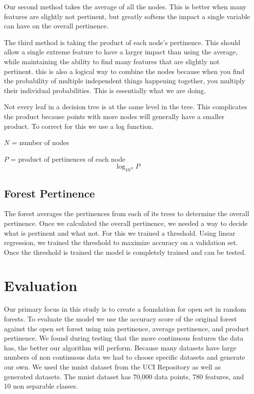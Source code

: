 \documentclass[conference]{IEEEtran}
\begin{document}
Our second method takes the average of all the nodes.  This is better when many features are slightly not pertinent, but greatly softens the impact a single variable can have on the overall pertinence.  

The third method is taking the product of each node's pertinence.  This should allow a single extreme feature to have a larger impact than using the average, while maintaining the ability to find many features that are slightly not pertinent.  this is also a logical way to combine the nodes because when you find the probability of multiple independent things happening together, you multiply their individual probabilities.  This is essentially what we are doing.  

Not every leaf in a decision tree is at the same level in the tree.  This complicates the product because points with more nodes will generally have a smaller product.  To correct for this we use a log function.

$N$ = number of nodes 

$P$ = product of pertinences of each node
$$\log_{10^N} P$$
\subsection{Forest Pertinence}
The forest averages the pertinences from each of its trees to determine the overall pertinence.  Once we calculated the overall pertinence, we needed a way to decide what is pertinent and what not.  For this we trained a threshold.  Using linear regression, we trained the threshold to maximize accuracy on a validation set.  Once the threshold is trained the model is completely trained and can be tested.
 
\section{Evaluation}

Our primary focus in this study is to create a foundation for open set in random forests.  To evaluate the model we use the accuracy score of the original forest against the open set forest using min pertinence, average pertinence, and product pertinence.  We found during testing that the more continuous features the data has, the better our algorithm will perform.  Because many datasets have large numbers of non continuous data we had to choose specific datasets and generate our own.  We used the mnist dataset from the UCI Repository \cite{ucirepo} as well as generated datasets.  The mnist dataset has 70,000 data points, 780 features, and 10 non separable classes. 
\end{document}
